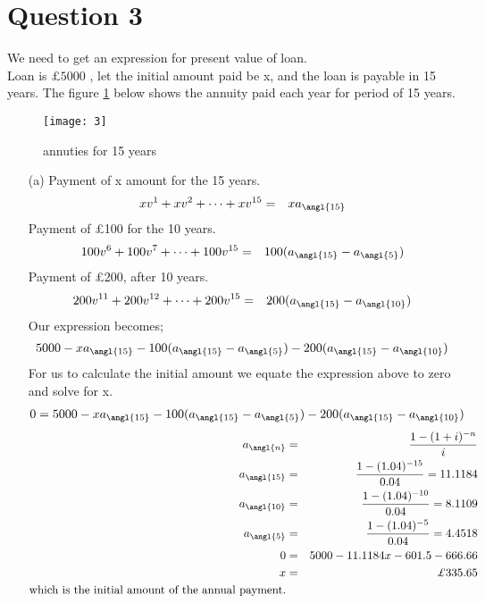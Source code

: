 \documentclass[12pt,a4paper]{article}
\begin{document}
\section*{Question 3}
We need to get an expression for present value of loan.\\
Loan is $ \pounds 5000$ , let the initial amount paid be x, and the loan is payable in 15 years.
The figure \ref{fig 3} below shows the annuity paid each year for period of 15 years.
\begin{figure}[H]
\texttt{[image: 3]}
\centering
\caption{annuties for 15 years}
\label{fig 3}
\end{figure}
\begin{enumerate}
\item[(a)]
Payment of x amount for the 15 years.
\begin{eqnarray*}
xv^1+xv^2+\cdots +xv^{15}&=&x a_{\angl{15}}
\end{eqnarray*}
Payment of \pounds 100 for the 10 years.
\begin{eqnarray*}
100v^6+100v^7+\cdots +100 v^{15}&=&100(a_{\angl{15}}-a_{\angl{5}})
\end{eqnarray*}
Payment of \pounds 200, after 10 years.
\begin{eqnarray*}
200v^{11}+200v^{12}+\cdots + 200v^{15}&=&200(a_{\angl{15}}-a_{\angl{10}})
\end{eqnarray*}
Our expression becomes;
\begin{eqnarray*}
5000- x a_{\angl{15}}-100(a_{\angl{15}}-a_{\angl{5}})-200(a_{\angl{15}}-a_{\angl{10}})
\end{eqnarray*}
For us to calculate the initial amount we equate the expression above to zero and solve for x.
\begin{eqnarray*}
0=5000- x a_{\angl{15}}-100(a_{\angl{15}}-a_{\angl{5}})-200(a_{\angl{15}}-a_{\angl{10}})
\end{eqnarray*}
\begin{eqnarray*}
a_{\angl{n}}&=&\frac{1-(1+i)^{-n}}{i}\\
a_{\angl{15}}&=& \frac{1-(1.04)^{-15}}{0.04} = 11.1184\\
a_{\angl{10}}&=& \frac{1-(1.04)^{-10}}{0.04} = 8.1109\\
a_{\angl{5}}&=& \frac{1-(1.04)^{-5}}{0.04} = 4.4518\\
0&=& 5000-11.1184x-601.5-666.66\\
x&=&\pounds 335.65\\
\text{which is the initial amount of the annual payment.}
\end{eqnarray*}

\end{enumerate}
\end{document}

